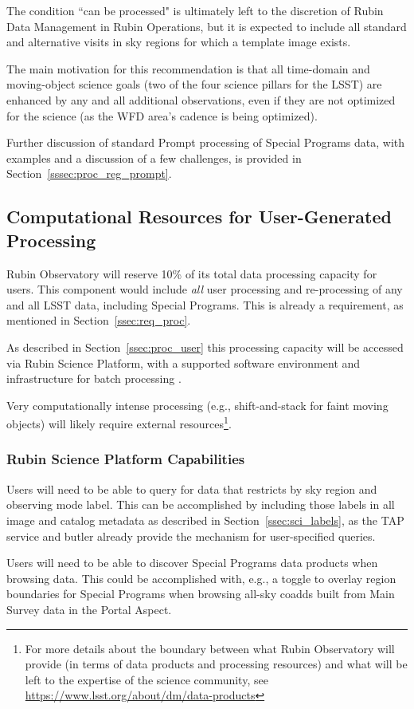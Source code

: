 The condition ``can be processed" is ultimately left to the discretion of
Rubin Data Management in Rubin Operations, but it is expected to include
all standard and alternative visits in sky regions for which a template image exists.

The main motivation for this recommendation is that all time-domain and 
moving-object science goals (two of the four science pillars for the LSST) are
enhanced by any and all additional observations, even if they are not
optimized for the science (as the WFD area's cadence is being optimized).

Further discussion of standard Prompt processing of Special Programs data, with
examples and a discussion of a few challenges,
is provided in Section~\ref{sssec:proc_reg_prompt}.

\subsection{Computational Resources for User-Generated Processing}\label{ssec:sci_comp}

Rubin Observatory will reserve 10\% of its total data processing capacity for users.
This component would include {\it all} user processing and re-processing of any and 
all LSST data, including Special Programs. 
This is already a requirement, as mentioned in Section~\ref{ssec:req_proc}.

As described in Section~\ref{ssec:proc_user} this processing capacity will be 
accessed via Rubin Science Platform, with a supported software environment and 
infrastructure for batch processing .

Very computationally intense processing (e.g., shift-and-stack for faint moving 
objects) will likely require external resources\footnote{For more details about 
the boundary between what Rubin Observatory will provide (in terms of data products 
and processing resources) and what will be left to the expertise of the science community, 
see \url{https://www.lsst.org/about/dm/data-products}}.

\subsubsection{Rubin Science Platform Capabilities}\label{sssec:sci_rsp}

Users will need to be able to query for data that restricts by sky region and 
observing mode label. 
This can be accomplished by including those labels in all image and catalog 
metadata as described in Section~\ref{ssec:sci_labels}, as the TAP service 
and butler already provide the mechanism for user-specified queries.

Users will need to be able to discover Special Programs data products when 
browsing data.
This could be accomplished with, e.g., a toggle to overlay region boundaries
for Special Programs when browsing all-sky coadds built from Main Survey data
in the Portal Aspect.


